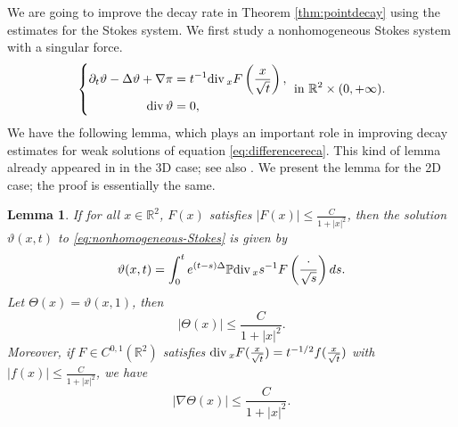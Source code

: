 \documentclass[12pt]{amsart}
\renewcommand{\div}{{\rm div \thinspace }}
\numberwithin{equation}{section}              %
\newtheorem{lemma}{Lemma}[section]
\theoremstyle{remark}
\begin{document}
		We are going to improve the decay rate in Theorem \ref{thm:pointdecay} using the estimates for the Stokes system. 
		We first study a nonhomogeneous Stokes system with a singular
		force. 
		\begin{equation}	\label{eq:nonhomogeneous-Stokes}
			\left\{
			\begin{aligned}
				\partial_t \vartheta - \Delta \vartheta + \nabla \pi &= t^{-1}\div_x F\left(\frac{x}{\sqrt{t}}\right), \\
				\div \vartheta &= 0,
			\end{aligned}
			\right. \text{ in } \mathbb{R}^2 \times (0, +\infty).
		\end{equation}
		We have the  following lemma, which plays an important role in improving decay estimates for weak solutions of equation 	\eqref{eq:differencereca}. This kind of lemma already appeared in \cite[Lemma 4.1]{Jia14} in the 3D case; see also \cite[Lemma 3.15]{Yang26}. We present the lemma for the 2D case; the proof is essentially the same.
		\begin{lemma}\label{lem:nonhomogeneous-Stokes}
				If for all $x \in \mathbb{R}^2$, $F(x)$ satisfies $|F(x)| \leq\frac{C}{1+|x|^2}$, then the solution $\vartheta(x,t)$ to \eqref{eq:nonhomogeneous-Stokes} is given by
				\begin{equation}\label{eq:oseentensor}
					\vartheta(x,t) = \int_0^t   e^{(t-s)\Delta} \mathbb{P} \div_x s^{-1} F\left(\frac{\cdot}{\sqrt{s}}\right) ds.
				\end{equation}
				Let $\Theta(x) = \vartheta(x,1)$, then
				\begin{equation}
					|\Theta(x)| \leq \frac{C}{1+|x|^2}.
				\end{equation}
				Moreover, if $F \in C^{0,1}(\mathbb{R}^2)$ satisfies $\div_x F(\frac{x}{\sqrt{t}}) = t^{-1/2} f(\frac{x}{\sqrt{t}})$ with $|f(x)| \leq \frac{C}{1+|x|^2}$, 
				we have
				\begin{equation}
					|\nabla \Theta (x)| \leq \frac{C}{1+|x|^2}.
				\end{equation}
		\end{lemma}
\end{document}
